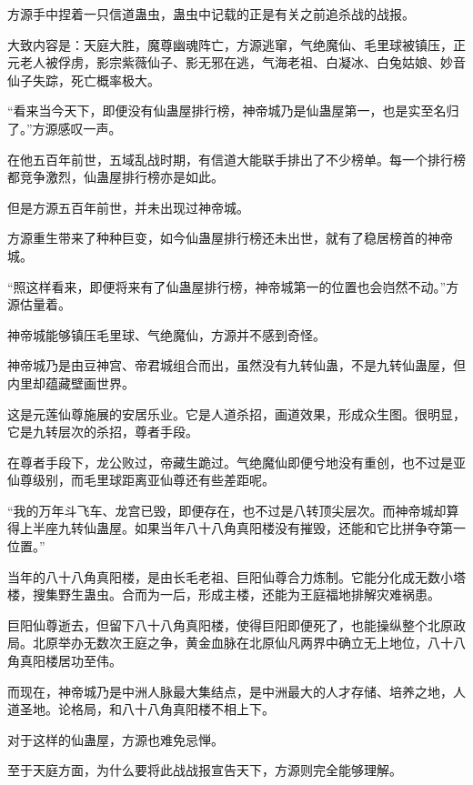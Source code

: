 
\begin{this_body}

方源手中捏着一只信道蛊虫，蛊虫中记载的正是有关之前追杀战的战报。

大致内容是：天庭大胜，魔尊幽魂阵亡，方源逃窜，气绝魔仙、毛里球被镇压，正元老人被俘虏，影宗紫薇仙子、影无邪在逃，气海老祖、白凝冰、白兔姑娘、妙音仙子失踪，死亡概率极大。

“看来当今天下，即便没有仙蛊屋排行榜，神帝城乃是仙蛊屋第一，也是实至名归了。”方源感叹一声。

在他五百年前世，五域乱战时期，有信道大能联手排出了不少榜单。每一个排行榜都竞争激烈，仙蛊屋排行榜亦是如此。

但是方源五百年前世，并未出现过神帝城。

方源重生带来了种种巨变，如今仙蛊屋排行榜还未出世，就有了稳居榜首的神帝城。

“照这样看来，即便将来有了仙蛊屋排行榜，神帝城第一的位置也会岿然不动。”方源估量着。

神帝城能够镇压毛里球、气绝魔仙，方源并不感到奇怪。

神帝城乃是由豆神宫、帝君城组合而出，虽然没有九转仙蛊，不是九转仙蛊屋，但内里却蕴藏壁画世界。

这是元莲仙尊施展的安居乐业。它是人道杀招，画道效果，形成众生图。很明显，它是九转层次的杀招，尊者手段。

在尊者手段下，龙公败过，帝藏生跪过。气绝魔仙即便兮地没有重创，也不过是亚仙尊级别，而毛里球距离亚仙尊还有些差距呢。

“我的万年斗飞车、龙宫已毁，即便存在，也不过是八转顶尖层次。而神帝城却算得上半座九转仙蛊屋。如果当年八十八角真阳楼没有摧毁，还能和它比拼争夺第一位置。”

当年的八十八角真阳楼，是由长毛老祖、巨阳仙尊合力炼制。它能分化成无数小塔楼，搜集野生蛊虫。合而为一后，形成主楼，还能为王庭福地排解灾难祸患。

巨阳仙尊逝去，但留下八十八角真阳楼，使得巨阳即便死了，也能操纵整个北原政局。北原举办无数次王庭之争，黄金血脉在北原仙凡两界中确立无上地位，八十八角真阳楼居功至伟。

而现在，神帝城乃是中洲人脉最大集结点，是中洲最大的人才存储、培养之地，人道圣地。论格局，和八十八角真阳楼不相上下。

对于这样的仙蛊屋，方源也难免忌惮。

至于天庭方面，为什么要将此战战报宣告天下，方源则完全能够理解。


\end{this_body}
